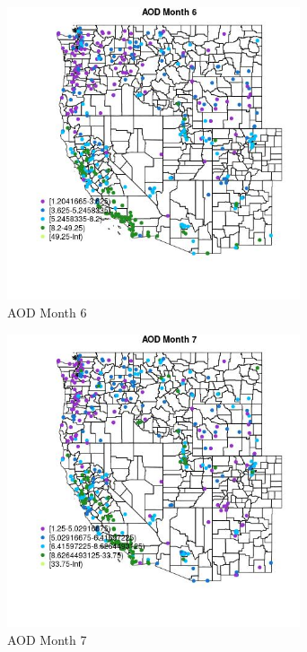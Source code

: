 \begin{figure} 
\centering  
\includegraphics[width=0.77\textwidth]{Code_Outputs/ML_input_report_ML_input_PM25_Step5_part_d_de_duplicated_aves_ML_input_MapObsMo6AOD.jpg} 
\caption{\label{fig:ML_input_report_ML_input_PM25_Step5_part_d_de_duplicated_aves_ML_inputMapObsMo6AOD}AOD Month 6} 
\end{figure} 
 

\begin{figure} 
\centering  
\includegraphics[width=0.77\textwidth]{Code_Outputs/ML_input_report_ML_input_PM25_Step5_part_d_de_duplicated_aves_ML_input_MapObsMo7AOD.jpg} 
\caption{\label{fig:ML_input_report_ML_input_PM25_Step5_part_d_de_duplicated_aves_ML_inputMapObsMo7AOD}AOD Month 7} 
\end{figure} 
 

